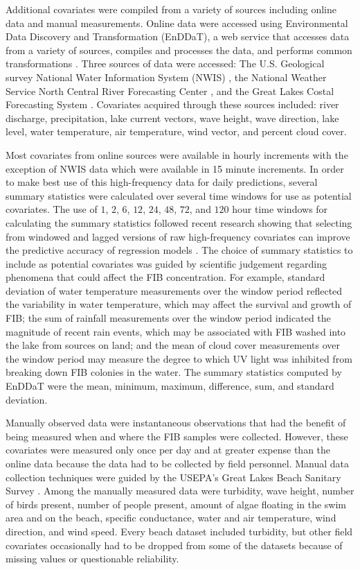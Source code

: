\documentclass[authoryear,review, 12pt]{elsarticle}
\begin{document}
Additional covariates were compiled from a variety of sources including
online data and manual measurements. Online data were accessed using
Environmental Data Discovery and Transformation (EnDDaT), a web service
that accesses data from a variety of sources, compiles and processes the
data, and performs common transformations \citep{EnDDaT-2014}. Three
sources of data were accessed: The U.S. Geological survey National Water
Information System (NWIS) \citep{NWIS}, the National Weather Service
North Central River Forecasting Center \citep{NCRFC}, and the Great Lakes
Costal Forecasting System \citep{Schwab-Bedford-1999}. Covariates
acquired through these sources included: river discharge, precipitation,
lake current vectors, wave height, wave direction, lake level, water
temperature, air temperature, wind vector, and percent cloud cover.

Most covariates from online sources were available in hourly increments
with the exception of NWIS data which were available in 15 minute
increments. In order to make best use of this high-frequency data for
daily predictions, several summary statistics were calculated over
several time windows for use as potential covariates. The use of $1$, $2$,
$6$, $12$, $24$, $48$, $72$, and $120$ hour time windows for calculating the summary
statistics followed recent research showing that selecting from windowed
and lagged versions of raw high-frequency covariates can improve the
predictive accuracy of regression models
\citep{Cyterski-Zhang-White-Molina-Wolfe-Parmar-Zepp-2012}. The choice of
summary statistics to include as potential covariates was guided by
scientific judgement regarding phenomena that could affect the FIB
concentration. For example, standard deviation of water temperature
measurements over the window period reflected the variability in water
temperature, which may affect the survival and growth of FIB; the sum of
rainfall measurements over the window period indicated the magnitude of
recent rain events, which may be associated with FIB washed into the
lake from sources on land; and the mean of cloud cover measurements over
the window period may measure the degree to which UV light was inhibited
from breaking down FIB colonies in the water. The summary statistics
computed by EnDDaT were the mean, minimum, maximum, difference, sum, and
standard deviation.

Manually observed data were instantaneous observations that had the
benefit of being measured when and where the FIB samples were collected.
However, these covariates were measured only once per day and at greater
expense than the online data because the data had to be collected by
field personnel. Manual data collection techniques were guided by the
USEPA's Great Lakes Beach Sanitary Survey \citep{USEPA:2008ib}. Among the
manually measured data were turbidity, wave height, number of birds
present, number of people present, amount of algae floating in the swim
area and on the beach, specific conductance, water and air temperature,
wind direction, and wind speed. Every beach dataset included turbidity,
but other field covariates occasionally had to be dropped from some of
the datasets because of missing values or questionable reliability.
\end{document}
